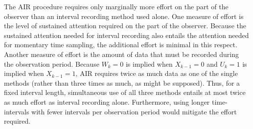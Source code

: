 \documentclass[man, noextraspace, floatsintext]{apa6}\usepackage[]{graphicx}\usepackage[]{color}
\begin{document}
The AIR procedure requires only marginally more effort on the part of the observer than an interval recording method used alone. 
One measure of effort is the level of sustained attention required on the part of the observer. Because the sustained attention needed for interval recording also entails the attention needed for momentary time sampling, the additional effort is minimal in this respect.
Another measure of effort is the amount of data that must be recorded during the observation period. Because $W_k = 0$ is implied when $X_{k-1} = 0$ and $U_k = 1$ is implied when $X_{k-1} = 1$, AIR requires twice as much data as one of the single methods (rather than three times as much, as might be supposed). 
Thus, for a fixed interval length, simultaneous use of all three methods entails at most twice as much effort as interval recording alone. 
Furthermore, using longer time-intervals with fewer intervals per observation period would mitigate the effort required.
\end{document}
